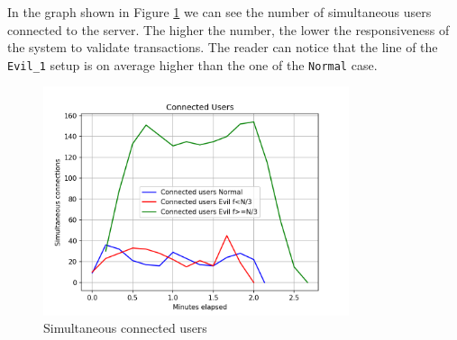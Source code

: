 \documentclass[]{article}
\begin{document}
In the graph shown in Figure \ref{simultaneous_users} we can see the number of simultaneous users connected to the server. The higher the number, the lower the responsiveness of the system to validate transactions. The reader can notice that the line of the \texttt{Evil\_1} setup is on average higher than the one of the \texttt{Normal} case.
\begin{figure}[h]
	\centering
	\includegraphics[width=0.8\textwidth]{simultaneous_users}
	\caption{\label{simultaneous_users} Simultaneous connected users}
\end{figure}
\end{document}
